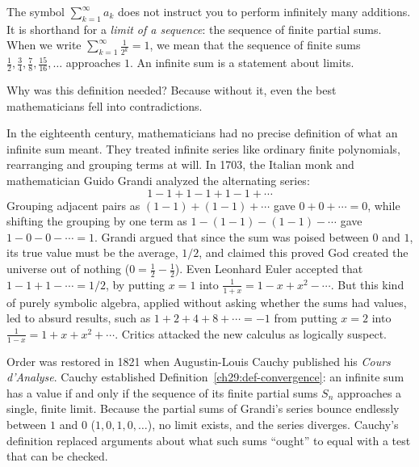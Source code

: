 \begin{happeningbox}
The symbol $\sum_{k=1}^{\infty} a_k$ does not instruct you to perform infinitely many additions. It is shorthand for a \emph{limit of a sequence}: the sequence of finite partial sums. When we write $\sum_{k=1}^\infty \tfrac{1}{2^k} = 1$, we mean that the sequence of finite sums $\tfrac12, \tfrac34, \tfrac78, \tfrac{15}{16}, \dots$ approaches $1$. An infinite sum is a statement about limits.
\end{happeningbox}

\begin{historybox}
Why was this definition needed? Because without it, even the best mathematicians fell into contradictions.

In the eighteenth century, mathematicians had no precise definition of what an infinite sum meant. They treated infinite series like ordinary finite polynomials, rearranging and grouping terms at will. In 1703, the Italian monk and mathematician Guido Grandi analyzed the alternating series:
\[
  1 - 1 + 1 - 1 + 1 - 1 + \cdots
\]
Grouping adjacent pairs as $(1 - 1) + (1 - 1) + \cdots$ gave $0 + 0 + \cdots = 0$, while shifting the grouping by one term as $1 - (1 - 1) - (1 - 1) - \cdots$ gave $1 - 0 - 0 - \cdots = 1$. Grandi argued that since the sum was poised between $0$ and $1$, its true value must be the average, $1/2$, and claimed this proved God created the universe out of nothing ($0 = \tfrac12 - \tfrac12$). Even Leonhard Euler accepted that $1 - 1 + 1 - \cdots = 1/2$, by putting $x = 1$ into $\frac{1}{1+x} = 1 - x + x^2 - \cdots$. But this kind of purely symbolic algebra, applied without asking whether the sums had values, led to absurd results, such as $1 + 2 + 4 + 8 + \cdots = -1$ from putting $x = 2$ into $\frac{1}{1-x} = 1 + x + x^2 + \cdots$. Critics attacked the new calculus as logically suspect.

Order was restored in 1821 when Augustin-Louis Cauchy published his \emph{Cours d'Analyse}. Cauchy established Definition~\ref{ch29:def-convergence}: an infinite sum has a value if and only if the sequence of its finite partial sums $S_n$ approaches a single, finite limit. Because the partial sums of Grandi's series bounce endlessly between $1$ and $0$ ($1, 0, 1, 0, \dots$), no limit exists, and the series diverges. Cauchy's definition replaced arguments about what such sums ``ought'' to equal with a test that can be checked.


\end{historybox}

